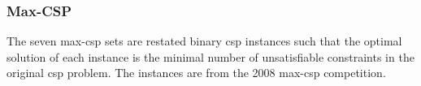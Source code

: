 

\subsubsection{Max-CSP}
The seven max-\gls{csp} sets are restated binary \gls{csp} instances such that the optimal solution of each instance is the minimal number of unsatisfiable constraints in the original \gls{csp} problem.
The instances are from the 2008 max-\gls{csp} competition.



